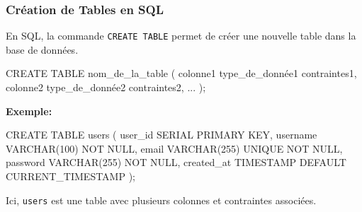 \begin{frame}[fragile]
  \frametitle{Création de Tables en SQL}

  En SQL, la commande \texttt{CREATE TABLE} permet de créer une nouvelle table dans la base de données.

  \begin{semiverbatim}
CREATE TABLE nom\_de\_la\_table (
    colonne1 type\_de\_donnée1 contraintes1,
    colonne2 type\_de\_donnée2 contraintes2,
    ...
);
  \end{semiverbatim}

  \textbf{Exemple:}
  \begin{semiverbatim}
CREATE TABLE users (
    user\_id SERIAL PRIMARY KEY,
    username VARCHAR(100) NOT NULL,
    email VARCHAR(255) UNIQUE NOT NULL,
    password VARCHAR(255) NOT NULL,
    created\_at TIMESTAMP DEFAULT CURRENT\_TIMESTAMP
);
  \end{semiverbatim}

  Ici, \texttt{users} est une table avec plusieurs colonnes et contraintes associées.

\end{frame}

